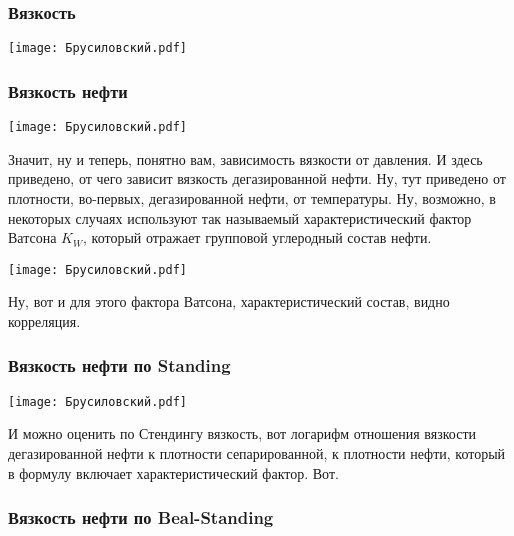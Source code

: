 \documentclass[main.tex]{subfiles}
\begin{document}
\subsubsection{Вязкость}

\begin{center}
\texttt{[image: Брусиловский.pdf]}
\end{center}



\subsubsection{Вязкость нефти}

\begin{center}
\texttt{[image: Брусиловский.pdf]}
\end{center}

Значит, ну и теперь, понятно вам, зависимость вязкости от давления.
И здесь приведено, от чего зависит вязкость дегазированной нефти.
Ну, тут приведено от плотности, во-первых, дегазированной нефти, от температуры.
Ну, возможно, в некоторых случаях используют так называемый характеристический фактор Ватсона $K_W$, который отражает групповой углеродный состав нефти.

\begin{center}
\texttt{[image: Брусиловский.pdf]}
\end{center}

Ну, вот и для этого фактора Ватсона, характеристический состав, видно корреляция.

\subsubsection{Вязкость нефти по Standing}

\begin{center}
\texttt{[image: Брусиловский.pdf]}
\end{center}

И можно оценить по Стендингу вязкость, вот логарифм отношения вязкости дегазированной нефти к плотности сепарированной, к плотности нефти, который в формулу включает характеристический фактор.
Вот.

\subsubsection{Вязкость нефти по Beal-Standing}
\end{document}
